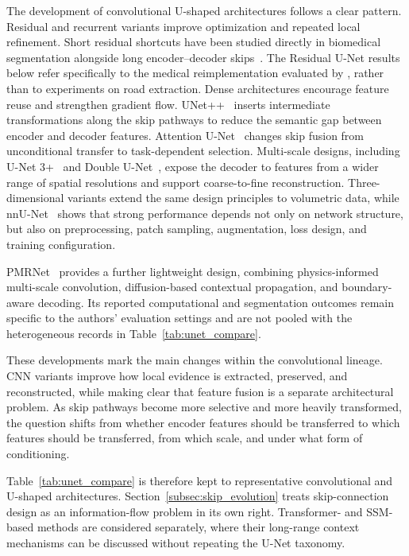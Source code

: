 \documentclass[5p,times,authoryear]{elsarticle}
\begin{document}
The development of convolutional U-shaped architectures follows a clear pattern. Residual and recurrent variants improve optimization and repeated local refinement. Short residual shortcuts have been studied directly in biomedical segmentation alongside long encoder--decoder skips~\citep{drozdzal2016skip_verified}. The Residual U-Net results below refer specifically to the medical reimplementation evaluated by \citet{azad2024unet_verified}, rather than to experiments on road extraction. Dense architectures encourage feature reuse and strengthen gradient flow. UNet++~\citep{zhou2018unetplusplus} inserts intermediate transformations along the skip pathways to reduce the semantic gap between encoder and decoder features. Attention U-Net~\citep{oktay2018attentionunet} changes skip fusion from unconditional transfer to task-dependent selection. Multi-scale designs, including U-Net 3+~\citep{review95_huang2020unet3plus} and Double U-Net~\citep{jha2020doubleu}, expose the decoder to features from a wider range of spatial resolutions and support coarse-to-fine reconstruction. Three-dimensional variants extend the same design principles to volumetric data, while nnU-Net~\citep{isensee2021nnu} shows that strong performance depends not only on network structure, but also on preprocessing, patch sampling, augmentation, loss design, and training configuration.

PMRNet~\citep{kang2026pmrnet_cvpr} provides a further lightweight design, combining physics-informed multi-scale convolution, diffusion-based contextual propagation, and boundary-aware decoding. Its reported computational and segmentation outcomes remain specific to the authors' evaluation settings and are not pooled with the heterogeneous records in Table~\ref{tab:unet_compare}.

These developments mark the main changes within the convolutional lineage. CNN variants improve how local evidence is extracted, preserved, and reconstructed, while making clear that feature fusion is a separate architectural problem. As skip pathways become more selective and more heavily transformed, the question shifts from whether encoder features should be transferred to which features should be transferred, from which scale, and under what form of conditioning.

Table~\ref{tab:unet_compare} is therefore kept to representative convolutional and U-shaped architectures. Section~\ref{subsec:skip_evolution} treats skip-connection design as an information-flow problem in its own right. Transformer- and SSM-based methods are considered separately, where their long-range context mechanisms can be discussed without repeating the U-Net taxonomy.
\end{document}
